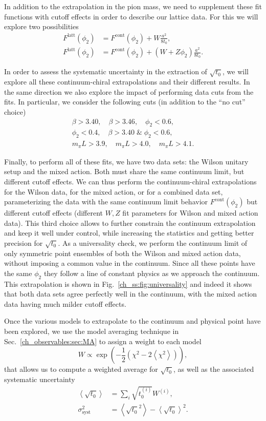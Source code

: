 In addition to the extrapolation in the pion mass, we need to supplement these fit functions with cutoff effects in order to describe our lattice data. For this we will explore two possibilities
\begin{align}
F^{\textrm{latt}}(\phi_2)&=F^{\textrm{cont}}(\phi_2)+W\frac{a^2}{8t_0},\\
F^{\textrm{latt}}(\phi_2)&=F^{\textrm{cont}}(\phi_2)+\left(W+Z\phi_2\right)\frac{a^2}{8t_0}.
\end{align}

In order to assess the systematic uncertainty in the extraction of $\sqrt{t_0}$, we will explore all these continuum-chiral extrapolations and their different results. In the same direction we also explore the impact of performing data cuts from the fits. In particular, we consider the following cuts (in addition to the ``no cut'' choice)
\begin{gather}
\beta>3.40, \quad
\beta>3.46, \quad
\phi_2<0.6, \\
\phi_2<0.4, \quad
\beta>3.40\;\&\;\phi_2<0.6, \\
m_{\pi}L>3.9, \quad
m_{\pi}L>4.0, \quad
m_{\pi}L>4.1.
\end{gather}

Finally, to perform all of these fits, we have two data sets: the Wilson unitary setup and the mixed action. Both must share the same continuum limit, but different cutoff effects. We can thus perform the continuum-chiral extrapolations for the Wilson data, for the mixed action, or for a combined data set, parameterizing the data with the same continuum limit behavior $F^{\textrm{cont}}(\phi_2)$ but different cutoff effects (different $W,Z$ fit parameters for Wilson and mixed action data). This third choice allows to further constrain the continuum extrapolation and keep it well under control, while increasing the statistics and getting better precision for $\sqrt{t_0}$. As a universality check, we perform the continuum limit of only symmetric point ensembles of both the Wilson and mixed action data, without imposing a common value in the continuum. Since all these points have the same $\phi_2$ they follow a line of constant physics as we approach the continuum. This extrapolation is shown in Fig.~\ref{ch_ss:fig:universality} and indeed it shows that both data sets agree perfectly well in the continuum, with the mixed action data having much milder cutoff effects.

Once the various models to extrapolate to the continuum and physical point have been explored, we use the model averaging technique in Sec.~\ref{ch_observables:sec:MA} to assign a weight to each model 
\begin{equation}
W\propto\exp\left(-\frac{1}{2}\left(\chi^2-2\left<\chi^2\right>\right)\right),
\end{equation}
that allows us to compute a weighted average for $\sqrt{t_0}$, as well as the associated systematic uncertainty
\begin{align}
\left<\sqrt{t_0}\right>&=\sum_i\sqrt{t_0^{(i)}}W^{(i)},\\
\sigma^2_{\textrm{syst}}&=\left<\sqrt{t_0}^2\right>-\left<\sqrt{t_0}\right>^2.
\end{align}

